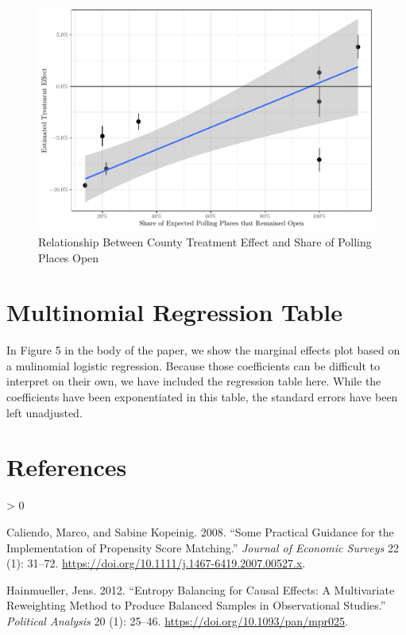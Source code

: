 \documentclass[
  12pt,
]{article}
\newlength{\cslhangindent}
\newenvironment{CSLReferences}[2] %
 {%
  \setlength{\parindent}{0pt}
  \ifodd #1 \everypar{\setlength{\hangindent}{\cslhangindent}}\ignorespaces\fi
  \ifnum #2 > 0
  \setlength{\parskip}{#2\baselineskip}
  \fi
 }%
 {}
\begin{document}
\begin{figure}[H]

{\centering \includegraphics{si_files/figure-latex/inter-chunk-1} 

}

\caption{\label{fig:inter-counties}Relationship Between County Treatment Effect and Share of Polling Places Open}\label{fig:inter-chunk}
\end{figure}

\hypertarget{multinomial-regression-table}{%
\section*{Multinomial Regression Table}\label{multinomial-regression-table}}

In Figure 5 in the body of the paper, we show the marginal effects plot based on a mulinomial logistic regression. Because those coefficients can be difficult to interpret on their own, we have included the regression table here. While the coefficients have been exponentiated in this table, the standard errors have been left unadjusted.

\begin{singlespace}

\end{singlespace}

\hypertarget{references}{%
\section*{References}\label{references}}

\hypertarget{refs}{}
\begin{CSLReferences}{1}{0}
\leavevmode\hypertarget{ref-Caliendo2008}{}%
Caliendo, Marco, and Sabine Kopeinig. 2008. {``Some {Practical Guidance} for the {Implementation} of {Propensity Score Matching}.''} \emph{Journal of Economic Surveys} 22 (1): 31--72. \url{https://doi.org/10.1111/j.1467-6419.2007.00527.x}.

\leavevmode\hypertarget{ref-Hainmueller2012}{}%
Hainmueller, Jens. 2012. {``Entropy {Balancing} for {Causal Effects}: {A Multivariate Reweighting Method} to {Produce Balanced Samples} in {Observational Studies}.''} \emph{Political Analysis} 20 (1): 25--46. \url{https://doi.org/10.1093/pan/mpr025}.

\end{CSLReferences}
\end{document}
